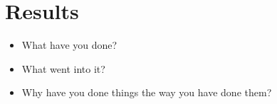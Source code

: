 \section{\notstarted Results}

\begin{itemize}
    \item What have you done?
    \item What went into it?
    \item Why have you done things the way you have done them?
\end{itemize}
